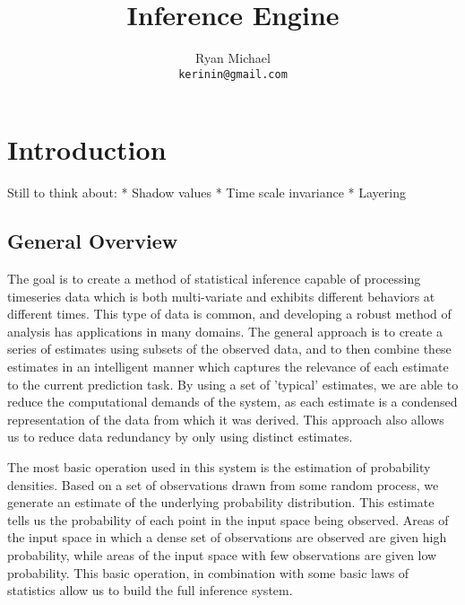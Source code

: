 \documentclass[11pt,titlepage]{article}
\begin{document}
\title{Inference Engine}
\author{Ryan Michael\\ \texttt{kerinin@gmail.com}}
\maketitle


\section{Introduction}
Still to think about:
* Shadow values
* Time scale invariance
* Layering


\subsection{General Overview}
The goal is to create a method of statistical inference capable of processing timeseries data which is both multi-variate and exhibits different behaviors at different times.  This type of data is common, and developing a robust method of analysis has applications in many domains.  The general approach is to create a series of estimates using subsets of the observed data, and to then combine these estimates in an intelligent manner which captures the relevance of each estimate to the current prediction task.  By using a set of 'typical' estimates, we are able to reduce the computational demands of the system, as each estimate is a condensed representation of the data from which it was derived.  This approach also allows us to reduce data redundancy by only using distinct estimates.

The most basic operation used in this system is the estimation of probability densities.  Based on a set of observations drawn from some random process, we generate an estimate of the underlying probability distribution.  This estimate tells us the probability of each point in the input space being observed.  Areas of the input space in which a dense set of observations are observed are given high probability, while areas of the input space with few observations are given low probability.  This basic operation, in combination with some basic laws of statistics allow us to build the full inference system.
\end{document}
